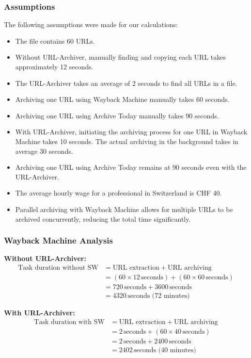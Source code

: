 \subsubsection{Assumptions}
The following assumptions were made for our calculations:
\begin{itemize}
    \item The file contains 60 URLs.
    \item Without URL-Archiver, manually finding and copying each URL takes approximately 12 seconds.
    \item The URL-Archiver takes an average of 2 seconds to find all URLs in a file.
    \item Archiving one URL using Wayback Machine manually takes 60 seconds.
    \item Archiving one URL using Archive Today manually takes 90 seconds.
    \item With URL-Archiver, initiating the archiving process for one URL in Wayback Machine takes 10 seconds. The actual archiving in the background takes in average 30 seconds.
    \item Archiving one URL using Archive Today remains at 90 seconds even with the URL-Archiver.
    \item The average hourly wage for a professional in Switzerland is CHF 40.
    \item Parallel archiving with Wayback Machine allows for multiple URLs to be archived concurrently, reducing the total time significantly.
\end{itemize}

\subsubsection{Wayback Machine Analysis}
\textbf{Without URL-Archiver:}
\begin{align*}
    \text{Task duration without SW} &= \text{URL extraction} + \text{URL archiving} \\
    &= (60 \times 12\, \text{seconds}) + (60 \times 60\, \text{seconds}) \\
    &= 720\, \text{seconds} + 3600\, \text{seconds} \\
    &= 4320\, \text{seconds (72 minutes)}
\end{align*}

\textbf{With URL-Archiver:}
\begin{align*}
    \text{Task duration with SW} &= \text{URL extraction} + \text{URL archiving} \\
    &= 2\, \text{seconds} + (60 \times 40\, \text{seconds}) \\
    &= 2\, \text{seconds} + 2400\, \text{seconds} \\
    &= 2402\, \text{seconds (40 minutes)}
\end{align*}

